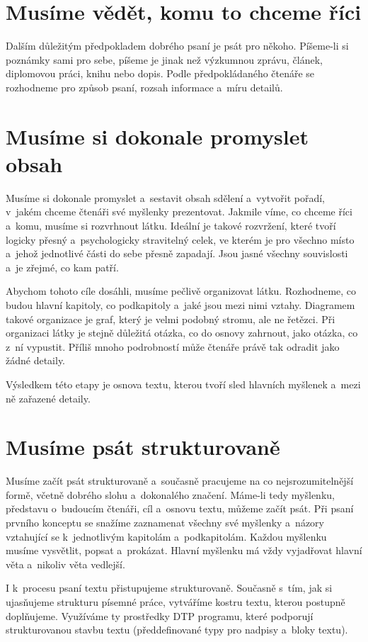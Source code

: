 \documentclass[english,cover]{fitthesis} %
\begin{document}
\section{Musíme vědět, komu to chceme říci}
Dalším důležitým předpokladem dobrého psaní je psát pro někoho. Píšeme-li si poznámky sami pro sebe, píšeme je jinak než výzkumnou zprávu, článek, diplomovou práci, knihu nebo dopis. Podle předpokládaného čtenáře se rozhodneme pro způsob psaní, rozsah informace a~míru detailů.

\section{Musíme si dokonale promyslet obsah}
Musíme si dokonale promyslet a~sestavit obsah sdělení a~vytvořit pořadí, v~jakém chceme čtenáři své myšlenky prezentovat. 
Jakmile víme, co chceme říci a~komu, musíme si rozvrhnout látku. Ideální je takové rozvržení, které tvoří logicky přesný a~psychologicky stravitelný celek, ve kterém je pro všechno místo a~jehož jednotlivé části do sebe přesně zapadají. Jsou jasné všechny souvislosti a~je zřejmé, co kam patří.

Abychom tohoto cíle dosáhli, musíme pečlivě organizovat látku. Rozhodneme, co budou hlavní kapitoly, co podkapitoly a~jaké jsou mezi nimi vztahy. Diagramem takové organizace je graf, který je velmi podobný stromu, ale ne řetězci. Při organizaci látky je stejně důležitá otázka, co do osnovy zahrnout, jako otázka, co z~ní vypustit. Příliš mnoho podrobností může čtenáře právě tak odradit jako žádné detaily.

Výsledkem této etapy je osnova textu, kterou tvoří sled hlavních myšlenek a~mezi ně zařazené detaily.

\section{Musíme psát strukturovaně} 
Musíme začít psát strukturovaně a~současně pracujeme na co nejsrozumitelnější formě, včetně dobrého slohu a~dokonalého značení. 
Máme-li tedy myšlenku, představu o~budoucím čtenáři, cíl a~osnovu textu, můžeme začít psát. Při psaní prvního konceptu se snažíme zaznamenat všechny své myšlenky a~názory vztahující se k~jednotlivým kapitolám a~podkapitolám. Každou myšlenku musíme vysvětlit, popsat a~prokázat. Hlavní myšlenku má vždy vyjadřovat hlavní věta a~nikoliv věta vedlejší.

I k~procesu psaní textu přistupujeme strukturovaně. Současně s~tím, jak si ujasňujeme strukturu písemné práce, vytváříme kostru textu, kterou postupně doplňujeme. Využíváme ty prostředky DTP programu, které podporují strukturovanou stavbu textu (předdefinované typy pro nadpisy a~bloky textu). 
\end{document}
